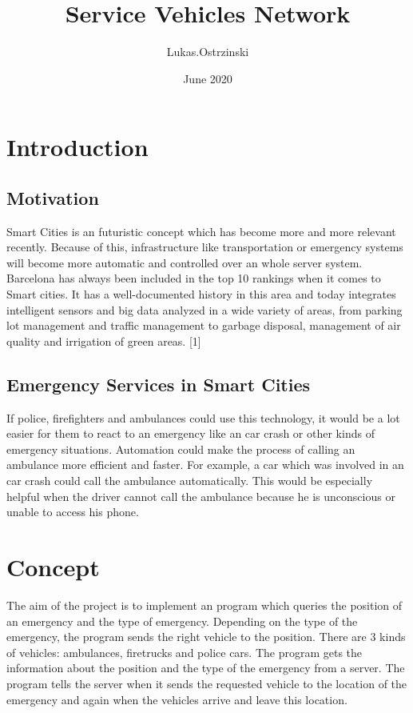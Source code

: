\documentclass{article}
\title{Service Vehicles Network}
\author{Lukas.Ostrzinski }
\date{June 2020}
\begin{document}
\maketitle

\section{Introduction}

\subsection{Motivation}
Smart Cities is an futuristic concept which has become more and more relevant recently. Because of this, infrastructure like transportation or emergency systems will become more automatic and controlled over an whole server system. 
\newline
Barcelona has always been included in the top 10 rankings when it comes to Smart cities. It has a well-documented history in this area and today integrates intelligent sensors and big data analyzed in a wide variety of areas, from parking lot management and traffic management to garbage disposal, management of air quality and irrigation of green areas. [1]

\subsection{Emergency Services in Smart Cities}
If police, firefighters and ambulances could use this technology, it would be a lot easier for them to react to an emergency like an car crash or other kinds of emergency situations. Automation could make the process of calling an ambulance more efficient and faster. For example, a car which was involved in an car crash could call the ambulance automatically. This would be especially helpful when the driver cannot call the ambulance because he is unconscious or unable to access his phone.




\section{Concept}
The aim of the project is to implement an program which queries the position of an emergency and the type of emergency. Depending on the type of the emergency, the program sends the right vehicle to the position. 
There are 3 kinds of vehicles: ambulances, firetrucks and police cars.
\newline
The program gets the information about the position and the type of the emergency from a server. The program tells the server when it sends the requested vehicle to the location of the emergency and again when the vehicles arrive and leave this location. 
\end{document}
